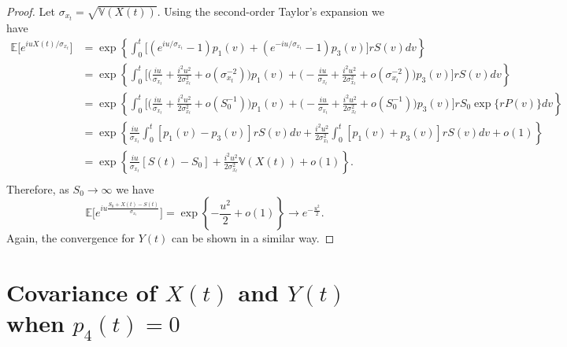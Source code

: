 \documentclass[10pt]{article}
\newcommand{\Var}{\mathbb{V}}
\newcommand{\EE}{\mathbb{E}}
\begin{document}
\begin{proof}
Let $\sigma_{x_t} = \sqrt{\Var(X(t))}$. Using the second-order Taylor's expansion we have
\begin{equation*}
\begin{split}
\EE \Big[e^{iu X(t)/\sigma_{x_t}} \Big] &= \exp \left\{  \int_0^t \Big[ \left(e^{i u/\sigma_{x_t}} - 1\right)p_1(v) + \left(e^{-i u/\sigma_{x_t}} - 1\right)p_3(v)\Big] r S(v) dv\right\} \\
& = \exp \left\{ \int_0^t \Big[ \Big( \frac{iu}{\sigma_{x_t}} + \frac{i^2 u^2}{2 \sigma^2_{x_t}} + o\left(\sigma^{-2}_{x_t}\right) \Big) p_1(v) +  \Big(- \frac{iu}{\sigma_{x_t}} + \frac{i^2 u^2}{2 \sigma^2_{x_t}} + o\left(\sigma^{-2}_{x_t}\right) \Big) p_3(v)  \Big] r S(v) dv\right\} \\
& = \exp \left\{ \int_0^t \Big[ \Big( \frac{iu}{\sigma_{x_t}} + \frac{i^2 u^2}{2 \sigma^2_{x_t}} + o\left(S_0^{-1}\right) \Big) p_1(v) +  \Big(- \frac{iu}{\sigma_{x_t}} + \frac{i^2 u^2}{2 \sigma^2_{x_t}} + o\left(S_0^{-1}\right) \Big) p_3(v)  \Big] r S_0\exp\{r P(v)\} dv\right\} \\
& = \exp \left\{ \frac{iu}{\sigma_{x_t}} \int_0^t  [p_1(v) - p_3(v)] r S(v) dv + \frac{i^2u^2}{2\sigma^2_{x_t}}\int_0^t  [p_1(v) + p_3(v)] r S(v) dv  +  o (1) \right\} \\
& = \exp \left\{ \frac{iu}{\sigma_{x_t}} [S(t)-S_0] + \frac{i^2u^2}{2\sigma^2_{x_t}}\Var(X(t)) +  o (1)\right\}. \\
\end{split}
\end{equation*}
Therefore, as $S_0\to \infty$ we have
$$
\EE\Big[ e^{iu \frac{S_0+X(t)-S(t)} {\sigma_{x_t}}} \Big]= \exp \left\{ -\frac{u^2}{2} +  o (1)\right\} \rightarrow e^{- \frac{u^2}{2 }}.
$$
Again, the convergence for $Y(t)$ can be shown in a similar way.
\end{proof}

\newpage

\section{Covariance of $X(t)$ and $Y(t)$ when $p_4(t) = 0$}
\end{document}
